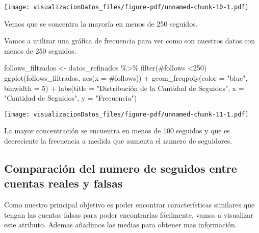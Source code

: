 \documentclass[
  letterpaper,
  DIV=11,
  numbers=noendperiod]{scrreprt}
\newenvironment{Shaded}{\begin{snugshade}}{\end{snugshade}}
\newcommand{\AttributeTok}[1]{\textcolor[rgb]{0.40,0.45,0.13}{#1}}
\newcommand{\DecValTok}[1]{\textcolor[rgb]{0.68,0.00,0.00}{#1}}
\newcommand{\FunctionTok}[1]{\textcolor[rgb]{0.28,0.35,0.67}{#1}}
\newcommand{\NormalTok}[1]{\textcolor[rgb]{0.00,0.23,0.31}{#1}}
\newcommand{\OtherTok}[1]{\textcolor[rgb]{0.00,0.23,0.31}{#1}}
\newcommand{\SpecialCharTok}[1]{\textcolor[rgb]{0.37,0.37,0.37}{#1}}
\newcommand{\StringTok}[1]{\textcolor[rgb]{0.13,0.47,0.30}{#1}}
\begin{document}
\texttt{[image: visualizacionDatos\_files/figure-pdf/unnamed-chunk-10-1.pdf]}

Vemos que se concentra la mayoría en menos de 250 seguidos.

Vamos a utilizar una gráfica de frecuencia para ver como son nuestros
datos con menos de 250 seguidos.

\begin{Shaded}
\begin{Highlighting}[]
\NormalTok{follows\_filtrados }\OtherTok{\textless{}{-}}\NormalTok{ datos\_refinados }\SpecialCharTok{\%\textgreater{}\%}  \FunctionTok{filter}\NormalTok{(}\StringTok{\textasciigrave{}}\AttributeTok{\#follows}\StringTok{\textasciigrave{}} \SpecialCharTok{\textless{}}\DecValTok{250}\NormalTok{)   }
\FunctionTok{ggplot}\NormalTok{(follows\_filtrados, }\FunctionTok{aes}\NormalTok{(}\AttributeTok{x =} \StringTok{\textasciigrave{}}\AttributeTok{\#follows}\StringTok{\textasciigrave{}}\NormalTok{)) }\SpecialCharTok{+}   
  \FunctionTok{geom\_freqpoly}\NormalTok{(}\AttributeTok{color =} \StringTok{"blue"}\NormalTok{, }\AttributeTok{binwidth =} \DecValTok{5}\NormalTok{) }\SpecialCharTok{+}   
  \FunctionTok{labs}\NormalTok{(}\AttributeTok{title =} \StringTok{"Distribución de la Cantidad de Seguidos"}\NormalTok{,        }
       \AttributeTok{x =} \StringTok{"Cantidad de Seguidos"}\NormalTok{,        }
       \AttributeTok{y =} \StringTok{"Frecuencia"}\NormalTok{)  }
\end{Highlighting}
\end{Shaded}

\texttt{[image: visualizacionDatos\_files/figure-pdf/unnamed-chunk-11-1.pdf]}

La mayor concentración se encuentra en menos de 100 seguidos y que es
decreciente la frecuencia a medida que aumenta el numero de seguidores.

\subsection{Comparación del numero de seguidos entre cuentas reales y
falsas}\label{comparaciuxf3n-del-numero-de-seguidos-entre-cuentas-reales-y-falsas}

Como nuestro principal objetivo es poder encontrar características
similares que tengan las cuentas falsas para poder encontrarlas
fácilmente, vamos a visualizar este atributo. Ademas añadimos las medias
para obtener mas información.
\end{document}
